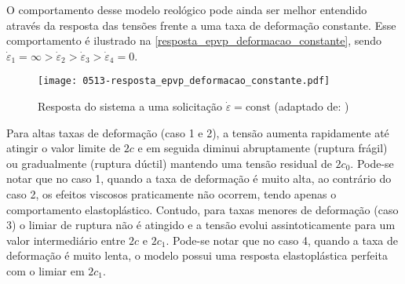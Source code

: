 O comportamento desse modelo reológico pode ainda ser melhor entendido através da resposta das tensões frente a uma taxa de deformação constante. Esse comportamento é ilustrado na \autoref{resposta_epvp_deformacao_constante}, sendo $\dot \varepsilon_1 = \infty > \dot \varepsilon_2 > \dot \varepsilon_3 > \dot \varepsilon_4 = 0$.
\begin{figure}[H]
	\begin{center}
		\texttt{[image: 0513-resposta\_epvp\_deformacao\_constante.pdf]}
	\end{center}
	\caption{\label{resposta_epvp_deformacao_constante}Resposta do sistema a uma solicitação $\dot \varepsilon = \text{const}$ (adaptado de: )}
\end{figure}
Para altas taxas de deformação (caso 1 e 2), a tensão aumenta rapidamente até atingir o valor limite de $2c$ e em seguida diminui abruptamente (ruptura frágil) ou gradualmente (ruptura dúctil) mantendo uma tensão residual de $2c_0$. Pode-se notar que no caso 1, quando a taxa de deformação é muito alta, ao contrário do caso 2, os efeitos viscosos praticamente não ocorrem, tendo apenas o comportamento elastoplástico. Contudo, para taxas menores de deformação (caso 3) o limiar de ruptura não é atingido e a tensão evolui assintoticamente para um valor intermediário entre $2c$ e $2c_1$. Pode-se notar que no caso 4, quando a taxa de deformação é muito lenta, o modelo possui uma resposta elastoplástica perfeita com o limiar em $2c_1$.


